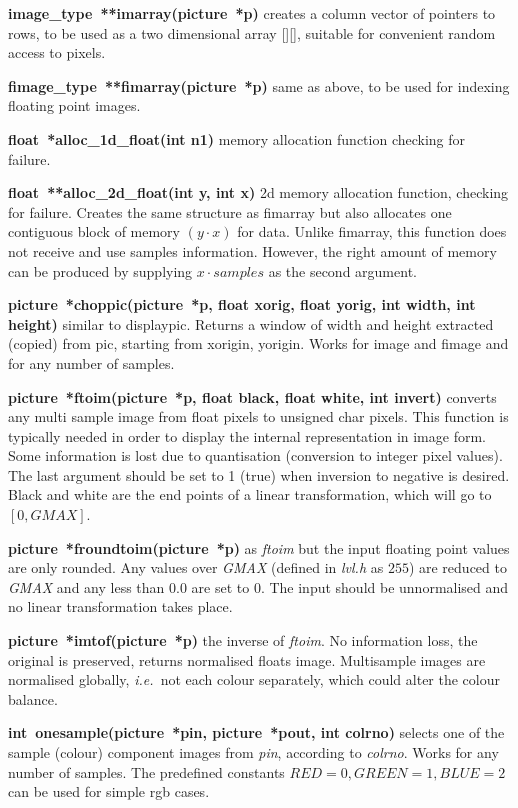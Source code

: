 \documentclass[11pt,twoside,english,a4paper]{article}
\def\ie{\emph{i.e.~}\ignorespaces}           %
\begin{document}
\textbf{image\_type~{*}{*}imarray(picture~{*p})} creates a column
vector of pointers to rows, to be used as a two dimensional array [][], 
suitable for convenient random access to pixels. 

\textbf{fimage\_type~{*}{*}fimarray(picture~{*p})} same as above,
to be used for indexing floating point images. 

\textbf{float~{*}alloc\_1d\_float(int n1)} memory allocation function
checking for failure.
 
\textbf{float~{*}{*}alloc\_2d\_float(int y, int x)} 2d memory allocation
function, checking for failure. Creates the same structure as fimarray 
but also allocates one contiguous block of memory $(y \cdot x)$ for data. 
Unlike fimarray, this function does not receive and use samples information.
However, the right amount of memory can be produced by 
supplying $x\cdot samples$ as the second argument.

\textbf{picture~{*}choppic(picture~{*p}, float xorig, float yorig, int width, int height)} 
similar to displaypic. Returns a window of width and height extracted (copied) from pic, 
starting from xorigin, yorigin. Works for image and fimage and for any number of samples.  

\textbf{picture~{*}ftoim(picture~{*p}, float black, float white, int invert)} 
converts any multi sample image from float pixels to unsigned char pixels. 
This function is typically needed in order to display
the internal representation in image form. Some information is lost
due to quantisation (conversion to integer pixel values). The last
argument should be set to 1 (true) when inversion to negative is desired.
Black and white are the end points of a linear transformation, 
which will go to $[0,GMAX]$.
 
\textbf{picture~{*}froundtoim(picture~{*p})} as \emph{ftoim} but the
input floating point values are only rounded. 
Any values over \emph{GMAX} (defined in \emph{lvl.h} as $255$) 
are reduced to \emph{GMAX} and any less than 0.0 are set to 0.
The input should be unnormalised and no linear transformation takes place. 
 
\textbf{picture~{*}imtof(picture~{*p})} the inverse of \emph{ftoim}.
No information loss, the original is preserved, returns normalised
floats image. Multisample images are normalised globally, \ie not each colour
separately, which could alter the colour balance. 

\textbf{int~onesample(picture~{*pin}, picture~{*pout}, int colrno)} selects one
of the sample (colour) component images from \emph{pin}, according to \emph{colrno}. 
Works for any number of samples. The predefined constants $RED=0, GREEN=1, BLUE=2$ 
can be used for simple rgb cases.
\end{document}
